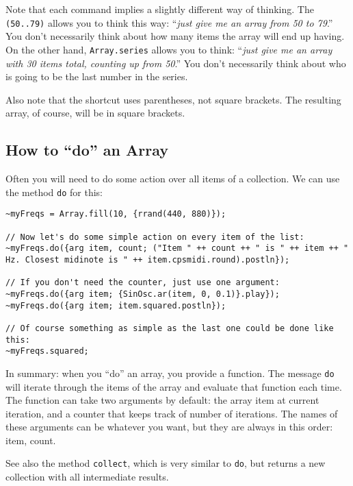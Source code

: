 Note that each command implies a slightly different way of thinking. The \texttt{(50..79)} allows you to think this way: ``\emph{just give me an array from 50 to 79}.'' You don't necessarily think about how many items the array will end up having. On the other hand, \texttt{Array.series} allows you to think: ``\emph{just give me an array with 30 items total, counting up from 50}.'' You don't necessarily think about who is going to be the last number in the series.

Also note that the shortcut uses parentheses, not square brackets. The resulting array, of course, will be in square brackets.

\subsection{How to ``do'' an Array}

Often you will need to do some action over all items of a collection. We can use the method \texttt{do} for this:

 
\begin{lstlisting}[style=SuperCollider-IDE, basicstyle=\scttfamily\footnotesize]
~myFreqs = Array.fill(10, {rrand(440, 880)});

// Now let's do some simple action on every item of the list:
~myFreqs.do({arg item, count; ("Item " ++ count ++ " is " ++ item ++ " Hz. Closest midinote is " ++ item.cpsmidi.round).postln});

// If you don't need the counter, just use one argument:
~myFreqs.do({arg item; {SinOsc.ar(item, 0, 0.1)}.play});
~myFreqs.do({arg item; item.squared.postln});

// Of course something as simple as the last one could be done like this:
~myFreqs.squared;
\end{lstlisting}
 

In summary: when you ``do'' an array, you provide a function. The message \texttt{do} will iterate through the items of the array and evaluate that function each time. The function can take two arguments by default: the array item at current iteration, and a counter that keeps track of number of iterations. The names of these arguments can be whatever you want, but they are always in this order: item, count.

See also the method \texttt{collect}, which is very similar to \texttt{do}, but returns a new collection with all intermediate results.
